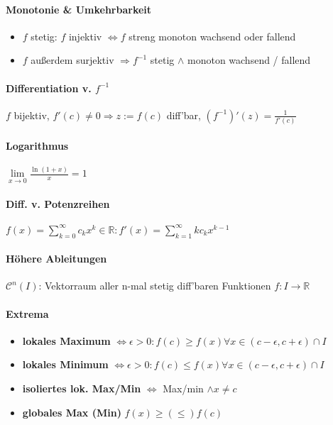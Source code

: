 \documentclass[paper=a4,paper=landscape, fontsize=6pt,DIV=25, twoside]{scrartcl}
\newcommand{\real}{{\mathbb{R}}}
\begin{document}
\begin{multicols*}{4}
			\paragraph{Monotonie \& Umkehrbarkeit}
			\begin{itemize}[noitemsep,nolistsep]
				\item $f$ stetig: $f$ injektiv $\Leftrightarrow f$ streng monoton wachsend oder fallend
				\item $f$ außerdem surjektiv $\Rightarrow f^{-1}$ stetig $\wedge$ monoton wachsend / fallend
			\end{itemize}
			\paragraph{Differentiation v. $f^{-1}$}
			$f$ bijektiv, $f'(c) \neq 0 \Rightarrow z := f(c)$ diff'bar, $(f^{-1})'(z)=\frac{1}{f'(c)}$
			\paragraph{Logarithmus}
			$\lim\limits_{x\rightarrow0} \frac{\ln(1+x)}{x}=1$
			\paragraph{Diff. v. Potenzreihen}
			$ f(x)=\sum_{k=0}^{\infty}c_kx^k \in \real: f'(x)=\sum_{k=1}^{\infty}kc_kx^{k-1}$
			\paragraph{Höhere Ableitungen}
			$\mathscr{C}^n(I)$: Vektorraum aller n-mal stetig diff'baren Funktionen $f: I \rightarrow \real$
			\paragraph{Extrema}
			\begin{itemize}[noitemsep,nolistsep]
				\item \textbf{lokales Maximum} $\Leftrightarrow \epsilon > 0: f(c) \geq f(x) \forall x \in (c-\epsilon,c+\epsilon)\cap I$
				\item \textbf{lokales Minimum} $\Leftrightarrow \epsilon > 0: f(c) \leq f(x) \forall x \in (c-\epsilon,c+\epsilon)\cap I$
				\item \textbf{isoliertes lok. Max/Min} $\Leftrightarrow$ Max/min $\wedge x \neq c$
				\item \textbf{globales Max (Min)} $f(x) \geq (\leq) f(c)$ 
			\end{itemize}

\end{multicols*}
\end{document}
